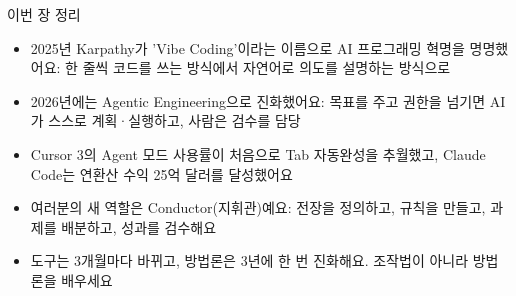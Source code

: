 \begin{tcbsummary}{이번 장 정리}
\begin{itemize}
  \item 2025년 Karpathy가 'Vibe Coding'이라는 이름으로 AI 프로그래밍 혁명을 명명했어요: 한 줄씩 코드를 쓰는 방식에서 자연어로 의도를 설명하는 방식으로
  \item 2026년에는 Agentic Engineering으로 진화했어요: 목표를 주고 권한을 넘기면 AI가 스스로 계획·실행하고, 사람은 검수를 담당
  \item Cursor 3의 Agent 모드 사용률이 처음으로 Tab 자동완성을 추월했고, Claude Code는 연환산 수익 25억 달러를 달성했어요
  \item 여러분의 새 역할은 Conductor(지휘관)예요: 전장을 정의하고, 규칙을 만들고, 과제를 배분하고, 성과를 검수해요
  \item 도구는 3개월마다 바뀌고, 방법론은 3년에 한 번 진화해요. 조작법이 아니라 방법론을 배우세요
\end{itemize}

\end{tcbsummary}
